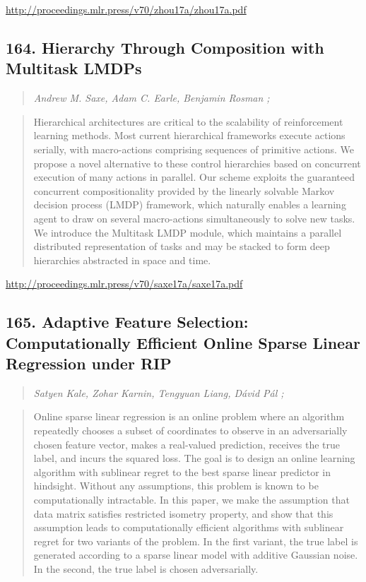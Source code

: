 \documentclass{article}
\begin{document}
\href{http://proceedings.mlr.press/v70/zhou17a/zhou17a.pdf}{http://proceedings.mlr.press/v70/zhou17a/zhou17a.pdf}

\subsection{164. Hierarchy Through Composition with Multitask LMDPs}

\begin{quote}
\footnotesize{\textit{Andrew M. Saxe, Adam C. Earle, Benjamin Rosman ;}}

\end{quote}

\begin{quote}
    Hierarchical architectures are critical to the scalability of reinforcement learning methods. Most current hierarchical frameworks execute actions serially, with macro-actions comprising sequences of primitive actions. We propose a novel alternative to these control hierarchies based on concurrent execution of many actions in parallel. Our scheme exploits the guaranteed concurrent compositionality provided by the linearly solvable Markov decision process (LMDP) framework, which naturally enables a learning agent to draw on several macro-actions simultaneously to solve new tasks. We introduce the Multitask LMDP module, which maintains a parallel distributed representation of tasks and may be stacked to form deep hierarchies abstracted in space and time.  
\end{quote}

\href{http://proceedings.mlr.press/v70/saxe17a/saxe17a.pdf}{http://proceedings.mlr.press/v70/saxe17a/saxe17a.pdf}

\subsection{165. Adaptive Feature Selection: Computationally Efficient Online Sparse Linear Regression under RIP}

\begin{quote}
\footnotesize{\textit{Satyen Kale, Zohar Karnin, Tengyuan Liang, Dávid Pál ;}}

\end{quote}

\begin{quote}
    Online sparse linear regression is an online problem where an algorithm repeatedly chooses a subset of coordinates to observe in an adversarially chosen feature vector, makes a real-valued prediction, receives the true label, and incurs the squared loss. The goal is to design an online learning algorithm with sublinear regret to the best sparse linear predictor in hindsight. Without any assumptions, this problem is known to be computationally intractable. In this paper, we make the assumption that data matrix satisfies restricted isometry property, and show that this assumption leads to computationally efficient algorithms with sublinear regret for two variants of the problem. In the first variant, the true label is generated according to a sparse linear model with additive Gaussian noise. In the second, the true label is chosen adversarially.  
\end{quote}
\end{document}
